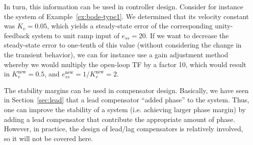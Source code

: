 \documentclass[a4paper,11pt]{report}
\theoremstyle{definition}
\begin{document}
In turn, this information can be used in controller design. Consider
for instance the system of Example~\ref{ex:bode-type1}. We determined
that its velocity constant was $K_v=0.05$, which yields a steady-state
error of the corresponding unity-feedback system to unit ramp input of
$e_{ss}=20$. If we want to decrease the steady-state error to
one-tenth of this value (without considering the change in the
transient behavior), we can for instance use a gain adjustment method
whereby we would multiply the open-loop TF by a factor 10, which would
result in $K_v^\textrm{new}=0.5$, and
$e_{ss}^\textrm{new}=1/K_v^\textrm{new}=2$.

The stability margins can be used in compensator design. Basically, we
have seen in Section~\ref{sec:lead} that a lead compensator ``added
phase'' to the system. Thus, one can improve the stability of a system
(i.e. achieving larger phase margin) by adding a lead compensator that
contribute the appropriate amount of phase. However, in practice, the
design of lead/lag compensators is relatively involved, so it will not
be covered here.


% 
% 
\end{document}
